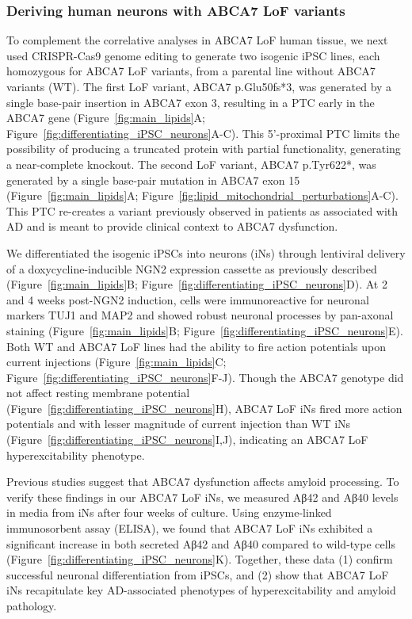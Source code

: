 \subsubsection{Deriving human neurons with ABCA7 LoF variants}
To complement the correlative analyses in ABCA7 LoF human tissue, we next used CRISPR-Cas9 genome editing to generate two isogenic iPSC lines, each homozygous for ABCA7 LoF variants, from a parental line without ABCA7 variants (WT). The first LoF variant, ABCA7 p.Glu50fs*3, was generated by a single base-pair insertion in ABCA7 exon 3, resulting in a PTC early in the ABCA7 gene (Figure~\ref{fig:main_lipids}A; Figure~\ref{fig:differentiating_iPSC_neurons}A-C). This 5’-proximal PTC limits the possibility of producing a truncated protein with partial functionality, generating a near-complete knockout. The second LoF variant, ABCA7 p.Tyr622*, was generated by a single base-pair mutation in ABCA7 exon 15 (Figure~\ref{fig:main_lipids}A; Figure~\ref{fig:lipid_mitochondrial_perturbations}A-C). This PTC re-creates a variant previously observed in patients as associated with AD \cite{Steinberg2015-mu} and is meant to provide clinical context to ABCA7 dysfunction. 

We differentiated the isogenic iPSCs into neurons (iNs) through lentiviral delivery of a doxycycline-inducible NGN2 expression cassette as previously described\cite{Ho2016-kz} (Figure~\ref{fig:main_lipids}B; Figure~\ref{fig:differentiating_iPSC_neurons}D). At 2 and 4 weeks post-NGN2 induction, cells were immunoreactive for neuronal markers TUJ1 and MAP2 and showed robust neuronal processes by pan-axonal staining (Figure~\ref{fig:main_lipids}B; Figure~\ref{fig:differentiating_iPSC_neurons}E). Both WT and ABCA7 LoF lines had the ability to fire action potentials upon current injections (Figure~\ref{fig:main_lipids}C; Figure~\ref{fig:differentiating_iPSC_neurons}F-J). Though the ABCA7 genotype did not affect resting membrane potential (Figure~\ref{fig:differentiating_iPSC_neurons}H), ABCA7 LoF iNs fired more action potentials and with lesser magnitude of current injection than WT iNs (Figure~\ref{fig:differentiating_iPSC_neurons}I,J), indicating an ABCA7 LoF hyperexcitability phenotype. 

Previous studies suggest that ABCA7 dysfunction affects amyloid processing\cite{Satoh2015-yu,Sakae2016-uy,Bamji-Mirza2018-xt,Chan2008-qu,De_Roeck2018-zx}. To verify these findings in our ABCA7 LoF iNs, we measured Aβ42 and Aβ40 levels in media from iNs after four weeks of culture. Using enzyme-linked immunosorbent assay (ELISA), we found that ABCA7 LoF iNs exhibited a significant increase in both secreted Aβ42 and Aβ40 compared to wild-type cells (Figure~\ref{fig:differentiating_iPSC_neurons}K). Together, these data (1) confirm successful neuronal differentiation from iPSCs, and (2) show that ABCA7 LoF iNs recapitulate key AD-associated phenotypes of hyperexcitability and amyloid pathology.

